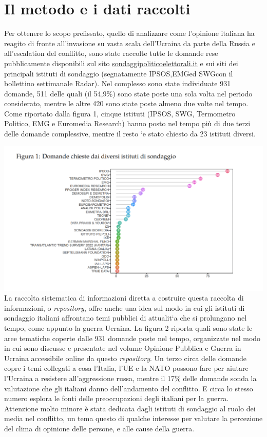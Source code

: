\documentclass[
  openany]{book}
\begin{document}
\hypertarget{il-metodo-e-i-dati-raccolti}{%
\section{Il metodo e i dati raccolti}\label{il-metodo-e-i-dati-raccolti}}

Per ottenere lo scopo prefissato, quello di analizzare come l'opinione italiana ha reagito
di fronte all'invasione su vasta scala dell'Ucraina da parte della Russia e all'escalation
del conflitto, sono state raccolte tutte le domande rese pubblicamente disponibili sul sito
\href{http://www.sondaggipoliticoelettorali.it/}{sondaggipoliticoelettorali.it} e sui
siti dei principali istituti di sondaggio (segnatamente IPSOS,EMGed SWGcon il bollettino
settimanale Radar). Nel complesso sono state individuate 931 domande, 511 delle
quali (il 54,9\%) sono state poste una sola volta nel periodo considerato, mentre le altre
420 sono state poste almeno due volte nel tempo. Come riportato dalla figura 1, cinque
istituti (IPSOS, SWG, Termometro Politico, EMG e Euromedia Research) hanno posto
nel tempo più di due terzi delle domande complessive, mentre il resto `e stato chiesto
da 23 istituti diversi.

\includegraphics{Images/Figura1.png}
La raccolta sistematica di informazioni diretta a costruire questa raccolta di informazioni,
o \emph{repository}, offre anche una idea sul modo in cui gli istituti di sondaggio italiani
affrontano temi pubblici di attualit`a che si prolungano nel tempo, come appunto la
guerra Ucraina. La figura 2 riporta quali sono state le aree tematiche coperte dalle 931
domande poste nel tempo, organizzate nel modo in cui sono discusse e presentate nel
volume Opinione Pubblica e Guerra in Ucraina accessibile online da questo \emph{repository}.
Un terzo circa delle domande copre i temi collegati a cosa l'Italia, l'UE e la NATO
possono fare per aiutare l'Ucraina a resistere all'aggressione russa, mentre il 17\% delle
domande sonda la valutazione che gli italiani danno dell'andamento del conflitto. E
circa lo stesso numero esplora le fonti delle preoccupazioni degli italiani per la guerra.
Attenzione molto minore è stata dedicata dagli istituti di sondaggio al ruolo dei media nel conflitto, un tema questo di qualche interesse per valutare la percezione del clima
di opinione delle persone, e alle cause della guerra.
\end{document}
